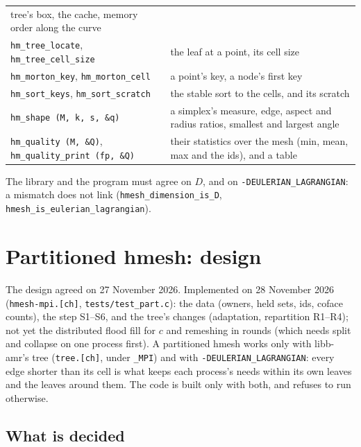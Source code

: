 \documentclass[10pt,a4paper]{article}
\theoremstyle{definition}
\newcommand{\fn}[1]{\texttt{#1}}
\begin{document}
\begin{center}
\begin{tabularx}{\textwidth}{@{}>{\raggedright}p{}X@{}}
    tree's box, the cache, memory order along the curve \\
  \fn{hm\_tree\_locate}, \fn{hm\_tree\_cell\_size} & the leaf at a point,
    its cell size \\
  \fn{hm\_morton\_key}, \fn{hm\_morton\_cell} & a point's key, a node's
    first key \\
  \fn{hm\_sort\_keys}, \fn{hm\_sort\_scratch} & the stable sort to the cells,
    and its scratch \\
  \fn{hm\_shape (M, k, s, \&q)} & a simplex's measure, edge, aspect and
    radius ratios, smallest and largest angle \\
  \fn{hm\_quality (M, \&Q)}, \fn{hm\_quality\_print (fp, \&Q)} & their
    statistics over the mesh (min, mean, max and the ids), and a table \\
  \bottomrule
\end{tabularx}
\end{center}

The library and the program must agree on $D$, and on
\fn{-DEULERIAN\_LAGRANGIAN}: a mismatch does not link
(\fn{hmesh\_dimension\_is\_D}, \fn{hmesh\_is\_eulerian\_lagrangian}).

\section{Partitioned hmesh: design}
\label{sec:part}

The design agreed on 27 November 2026. Implemented on 28 November 2026
(\fn{hmesh-mpi.[ch]}, \fn{tests/test\_part.c}): the data (owners, held
sets, ids, coface counts), the step S1--S6, and the tree's changes
(adaptation, repartition R1--R4); not yet the distributed flood fill for
$c$ and remeshing in rounds (which needs split and collapse on one
process first). A partitioned
hmesh works only with libb-amr's tree (\fn{tree.[ch]}, under \fn{\_MPI})
and with \fn{-DEULERIAN\_LAGRANGIAN}: every edge shorter than its cell is
what keeps each process's needs within its own leaves and the leaves
around them. The code is built only with both, and refuses to run
otherwise.

\subsection{What is decided}
\end{document}

